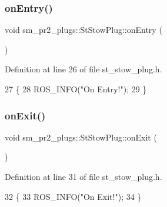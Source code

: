 \subsubsection{\texorpdfstring{on\+Entry()}{onEntry()}}
{\footnotesize\ttfamily void sm\+\_\+pr2\+\_\+plugs\+::\+St\+Stow\+Plug\+::on\+Entry (\begin{DoxyParamCaption}{ }\end{DoxyParamCaption})\hspace{0.3cm}{\ttfamily [inline]}}



Definition at line 26 of file st\+\_\+stow\+\_\+plug.\+h.


\begin{DoxyCode}
27     \{
28         ROS\_INFO(\textcolor{stringliteral}{"On Entry!"});
29     \}
\end{DoxyCode}
\mbox{\label{structsm__pr2__plugs_1_1StStowPlug_ac30e0c1205f0f02cddc7687fd9bf1c49}} 
\subsubsection{\texorpdfstring{on\+Exit()}{onExit()}}
{\footnotesize\ttfamily void sm\+\_\+pr2\+\_\+plugs\+::\+St\+Stow\+Plug\+::on\+Exit (\begin{DoxyParamCaption}{ }\end{DoxyParamCaption})\hspace{0.3cm}{\ttfamily [inline]}}



Definition at line 31 of file st\+\_\+stow\+\_\+plug.\+h.


\begin{DoxyCode}
32     \{
33         ROS\_INFO(\textcolor{stringliteral}{"On Exit!"});
34     \}
\end{DoxyCode}
\mbox{\label{structsm__pr2__plugs_1_1StStowPlug_a7a8c96a9affcf5e333fc0e96575141ec}} 
